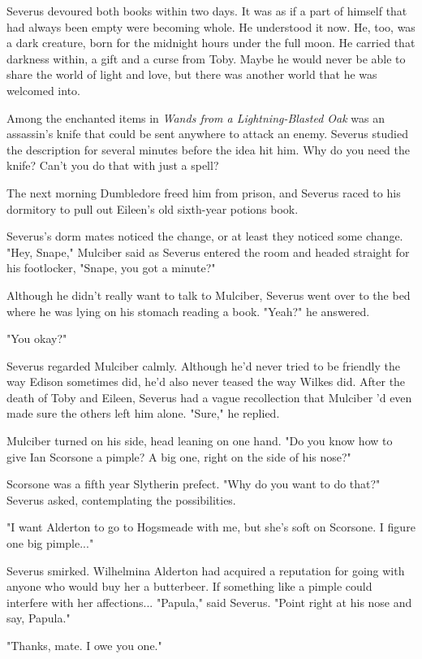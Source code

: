 \documentclass[a4paper,11pt]{article}
\begin{document}
Severus devoured both books within two days. It was as if a part of himself that had always been empty were becoming whole. He understood it now. He, too, was a dark creature, born for the midnight hours under the full moon. He carried that darkness within, a gift and a curse from Toby. Maybe he would never be able to share the world of light and love, but there was another world that he was welcomed into.

Among the enchanted items in \emph{Wands from a Lightning-Blasted Oak} was an assassin's knife that could be sent anywhere to attack an enemy. Severus studied the description for several minutes before the idea hit him. Why do you need the knife? Can't you do that with just a spell?

The next morning Dumbledore freed him from prison, and Severus raced to his dormitory to pull out Eileen's old sixth-year potions book.

Severus's dorm mates noticed the change, or at least they noticed some change. "Hey, Snape," Mulciber said as Severus entered the room and headed straight for his footlocker, "Snape, you got a minute?"

Although he didn't really want to talk to Mulciber, Severus went over to the bed where he was lying on his stomach reading a book. "Yeah?" he answered.

"You okay?"

Severus regarded Mulciber calmly. Although he'd never tried to be friendly the way Edison sometimes did, he'd also never teased the way Wilkes did. After the death of Toby and Eileen, Severus had a vague recollection that Mulciber 'd even made sure the others left him alone. "Sure," he replied.

Mulciber turned on his side, head leaning on one hand. "Do you know how to give Ian Scorsone a pimple? A big one, right on the side of his nose?"

Scorsone was a fifth year Slytherin prefect. "Why do you want to do that?" Severus asked, contemplating the possibilities.

"I want Alderton to go to Hogsmeade with me, but she's soft on Scorsone. I figure one big pimple..."

Severus smirked. Wilhelmina Alderton had acquired a reputation for going with anyone who would buy her a butterbeer. If something like a pimple could interfere with her affections... "Papula," said Severus. "Point right at his nose and say, Papula."

"Thanks, mate. I owe you one."
\end{document}
